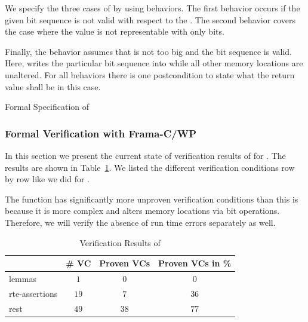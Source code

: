 We specify the three cases of \poke by using behaviors. 
The first behavior  occurs if the given bit sequence is not valid with respect to the . 
The second behavior  covers the case where the value  
is not representable with only  bits.

Finally, the behavior  assumes 
that  is not too big and the bit sequence is valid. 
Here, \poke writes the particular bit sequence into  
while all other memory locations are unaltered.
For all behaviors there is one postcondition to state what
the return value shall be in this case.


\begin{listing}[hbt]
\begin{minipage}{\textwidth}

\end{minipage}
\caption{\label{fig:spec-poke} Formal Specification of \poke}
\end{listing}



\FloatBarrier

\subsubsection{Formal Verification with Frama-C/WP}
\label{verification-poke}

In this section we present the current state of verification results of 
for \poke.
The results are shown in Table~\ref{tab:results-poke}.
 We listed the different verification conditions 
 row by row like we did for \peek.

The function \poke has significantly more unproven verification conditions than \peek
this is because it is more complex and alters memory locations via bit operations.
Therefore, we will verify the absence of run time errors separately as well.

\begin{table}[hbt]
  \centering
  \begin{tabular}[h]{lccc}
    \toprule
     & \# VC & Proven VCs & Proven VCs in \%\\
    \midrule
    lemmas & $1$ &$0$ & $0$ \\
    rte-assertions&$19$&$7$&$36$\\
    rest &$49$ &$38$&$77$\\
    \bottomrule
  \end{tabular}
  \caption{Verification Results of \poke}
  \label{tab:results-poke}
\end{table}



